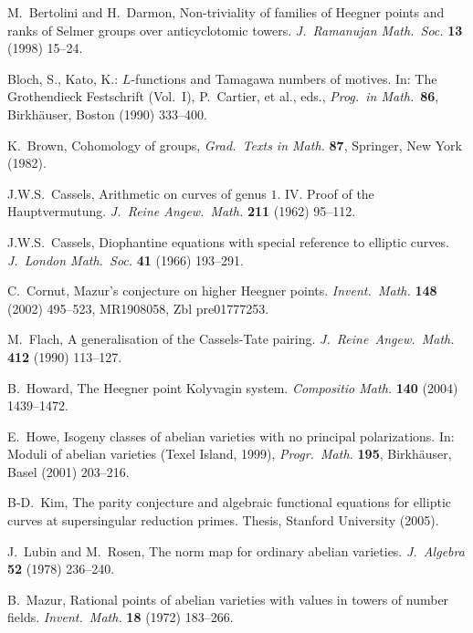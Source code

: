 \documentclass[reqno]{amsart}
\theoremstyle{definition}
\begin{document}
\begin{thebibliography}{MR1}

   M.\ Bertolini and H.\ Darmon, 
   Non-triviality of families of Heegner points and ranks of Selmer groups 
   over anticyclotomic towers. {\em J.\ Ramanujan Math.\ Soc.}
   {\bf 13} (1998) 15--24.

   Bloch, S., Kato, K.: $L$-functions and Tamagawa numbers of
   motives.  In: The 
   Grothendieck Festschrift (Vol.\ I), P.\ Cartier, et al., eds., 
   {\em Prog.\ in Math.}\ {\bf 86}, Birkh\"auser, Boston (1990) 333--400.
   
    K.\ Brown, Cohomology of groups, {\em Grad.\ Texts in Math.} {\bf 87},
    Springer, New York (1982).

   J.W.S.\ Cassels, Arithmetic on curves of genus $1$. IV. Proof of the Hauptvermutung. 
   {\em J.\ Reine Angew.\ Math.} {\bf 211} (1962) 95--112.

   J.W.S.\ Cassels, Diophantine equations with special reference to elliptic curves. 
   {\em J.\ London Math.\ Soc.} {\bf 41} (1966) 193--291.

   C.\ Cornut, Mazur's conjecture on higher Heegner points.
   {\em Invent.\ Math.} {\bf 148} (2002) 495--523, MR1908058, Zbl pre01777253.

   M.\ Flach, A generalisation of the Cassels-Tate pairing. 
   {\em J.\ Reine\ Angew.\ Math.} {\bf 412} (1990) 113--127. 

   B.\ Howard, The Heegner point Kolyvagin system. 
   {\em Compositio Math.} {\bf 140} (2004) 1439--1472.
   
   E.\ Howe, Isogeny classes of abelian varieties with no principal polarizations. 
   In: Moduli of abelian varieties (Texel Island, 1999), {\em Progr.\ Math.}
   {\bf 195}, Birkh\"auser, Basel (2001) 203--216.

   B-D.\ Kim, The parity conjecture and algebraic functional 
   equations for elliptic curves at supersingular 
   reduction primes.  Thesis, Stanford University (2005).

   J.\ Lubin and M.\ Rosen, The norm map for ordinary abelian varieties. 
   {\em J.\ Algebra} {\bf 52} (1978) 236--240.

   B.\ Mazur, Rational points of abelian varieties with values in towers 
   of number fields. {\em Invent.\ Math.} {\bf 18} (1972) 183--266.


\end{thebibliography}
\end{document}
